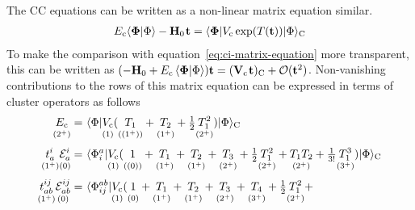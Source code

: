 \documentclass[11pt]{article}
\numberwithin{equation}{section}
\begin{document}
\begin{rmk}
\label{rmk:cc-perturbative-analysis}
The CC equations can be written as a non-linear matrix equation similar.
\begin{align}
\label{eq:cc-matrix-equation}
  E_\mr{c}
  \ip{\bm{\F}|\F}
-
  \bo{H}_0\hspace{0.8pt}
  \bo{t}
=
  \ip{\bm{\F}|
    V_\mr{c}\,
    \mr{exp}(T(\bo{t}))
  |\F}_\mr{C}
\end{align}
To make the comparison with equation~\ref{eq:ci-matrix-equation} more transparent, this can be written as
$
(
-
  \bo{H}_0
+
  E_\mr{c}\,
  \ip{\bm{\F}|\F}
)
  \bo{t}
=
  (
    \bo{V}_\mr{c}\hspace{0.8pt}
    \bo{t}
  )_{\mr{C}}
+
  \mc{O}(\bo{t}^2)
$.
Non-vanishing contributions to the rows of this matrix equation can be expressed in terms of cluster operators as follows
\begin{align}
\label{eq:cc-reference-equation}
  \underset{(2^+)}{\vphantom{(}
  E_\mr{c}
  }
=&\
  \ip{\F|
  \underset{(1)}{\vphantom{(}
    V_\mr{c}
  }
    (
    \underset{((1^{+}))}{\vphantom{(}
      T_1
    }
    +
    \underset{(1^{+})}{\vphantom{(}
      T_2
    }
    +
      \tfr{1}{2}
    \underset{(2^{+})}{\vphantom{(}
      T_1^2
    }
    )
  |\F}_\mr{C}
\\[3pt]
  \underset{(1^+)}{\vphantom{(}
  t_a^i
  }
  \underset{(0)}{\vphantom{(}
  \mc{E}_a^i
  }
=&\
  \ip{\F_i^a|
  \underset{(1)}{\vphantom{(}
    V_\mr{c}
  }
    (
    \underset{((0))}{\vphantom{(}
      1
    }
    +
    \underset{(1^{+})}{\vphantom{(}
      T_1
    }
    +
    \underset{(1^{+})}{\vphantom{(}
      T_2
    }
    +
    \underset{(2^{+})}{\vphantom{(}
      T_3
    }
    +
      \tfr{1}{2}
    \underset{(2^{+})}{\vphantom{(}
      T_1^2
    }
    +
    \underset{(2^{+})}{\vphantom{(}
      T_1T_2
    }
    +
      \tfr{1}{3!}
    \underset{(3^{+})}{\vphantom{(}
      T_1^3
    }
    )
  |\F}_\mr{C}
\\[3pt]
\nonumber
  \underset{(1^+)}{\vphantom{(}
  t_{ab}^{ij}
  }
  \underset{(0)}{\vphantom{(}
  \mc{E}_{ab}^{ij}
  }
=&\
  \br{\F_{ij}^{ab}}
  \underset{(1)}{\vphantom{(}
    V_\mr{c}
  }
    (
    \underset{(0)}{\vphantom{(}
      1
    }
    +
    \underset{(1^{+})}{\vphantom{(}
      T_1
    }
    +
    \underset{(1^{+})}{\vphantom{(}
      T_2
    }
    +
    \underset{(2^{+})}{\vphantom{(}
      T_3
    }
    +
    \underset{(3^{+})}{\vphantom{(}
      T_4
    }
    +
      \tfr{1}{2}
    \underset{(2^{+})}{\vphantom{(}
      T_1^2
    }
    +

\end{align}
\end{rmk}
\end{document}
